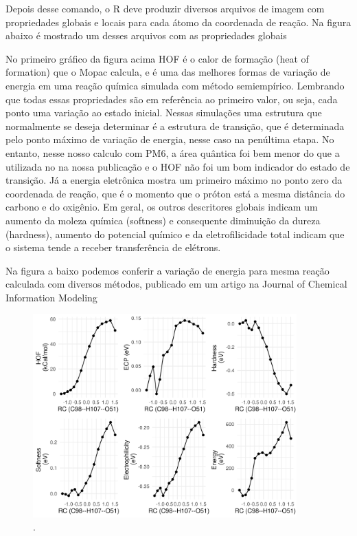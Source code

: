 \documentclass[a4paper,11pt]{refart}
\begin{document}
Depois desse comando, o R deve produzir diversos arquivos de imagem com propriedades globais e locais para cada átomo da coordenada de reação. Na figura abaixo é mostrado um desses arquivos com as propriedades globais

No primeiro gráfico da figura acima HOF é o calor de formação  (heat of formation) que o Mopac calcula, e é uma das melhores formas de variação de energia em uma reação química simulada com método semiempírico. Lembrando que todas essas propriedades são em referência ao primeiro valor, ou seja, cada ponto uma variação ao estado inicial. Nessas simulações uma estrutura que normalmente se deseja determinar é a estrutura de transição, que é determinada pelo ponto máximo de variação de energia, nesse caso na penúltima etapa. No entanto, nesse nosso calculo com PM6, a área quântica foi bem menor do que a utilizada no na nossa publicação e o HOF não foi um bom indicador do estado de transição. Já a energia eletrônica mostra um primeiro máximo no ponto zero da coordenada de reação, que é o momento que o próton está a mesma distância do carbono e do oxigênio. Em geral, os outros descritores globais indicam um aumento da moleza química (softness) e consequente diminuição da dureza (hardness), aumento do potencial químico e da eletrofilicidade total indicam que o sistema tende a receber transferência de elétrons.

Na figura a baixo podemos conferir a variação de energia para mesma reação calculada com diversos métodos, publicado em um artigo na Journal of Chemical Information Modeling 

\hspace*{-\leftmarginwidth}
\begin{minipage}{\fullwidth}
	\begin{figure}[H]
		\begin{center}
			\includegraphics[width=4in]{images/tut6_img2}
			\caption{.}
			\label{fig_tut6_1}
		\end{center}
	\end{figure}
\end{minipage}
\end{document}
